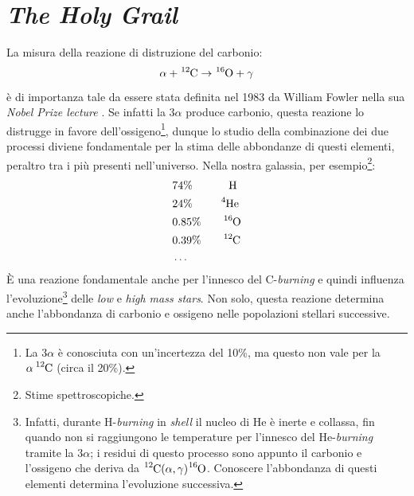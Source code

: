 \newpage
\section{\textit{The Holy Grail}}\label{sec-holy-grail}
La misura della reazione di distruzione del carbonio:
$$\alpha +\ce{^{12}C}\to\ce{^{16}O}+\gamma$$
è di importanza tale da essere stata definita nel 1983 da William Fowler nella sua \textit{Nobel Prize lecture} \textit{}. Se infatti la $3\alpha$ produce carbonio, questa reazione lo distrugge in favore dell'ossigeno\footnote{La $3\alpha$ è conosciuta con un'incertezza del 10\%, ma questo non vale per la $\alpha\, \ce{^{12}C}$ (circa il 20\%).}, dunque lo studio della combinazione dei due processi diviene fondamentale per la stima delle abbondanze di questi elementi, peraltro tra i più presenti nell'universo. Nella nostra galassia, per esempio\footnote{Stime spettroscopiche.}:
\begin{align*}
	&74\%\qquad\;\quad\ce{H} \\
	&24\%\qquad\;\;\ce{^{4}He} \\
	&0.85\%\qquad\ce{^{16}O} \\
	&0.39\%\qquad\ce{^{12}C} \\
	&\dots
\end{align*}
È una reazione fondamentale anche per l'innesco del C-\textit{burning} e quindi influenza l'evoluzione\footnote{Infatti, durante H-\textit{burning} in \textit{shell} il nucleo di He è inerte e collassa, fin quando non si raggiungono le temperature per l'innesco del He-\textit{burning} tramite la $3\alpha$; i residui di questo processo sono appunto il carbonio e l'ossigeno che deriva da $\ce{^{12}C}(\alpha,\gamma)\ce{^{16}O}$. Conoscere l'abbondanza di questi elementi determina l'evoluzione successiva.} delle \textit{low} e \textit{high mass stars}. Non solo, questa reazione determina anche l'abbondanza di carbonio e ossigeno nelle popolazioni stellari successive.

